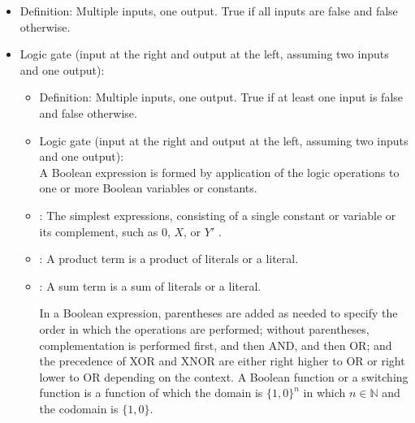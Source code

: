 \documentclass[a4paper,12pt]{article}
\begin{document}
\begin{itemize}
\begin{itemize}
\begin{itemize}
\begin{itemize}
\begin{itemize}
\begin{itemize}
\item Definition: Multiple inputs, one output. True if all inputs are false and false otherwise.
\item Logic gate (input at the right and output at the left, assuming two inputs and one output):\mbox{}\\
\eit
{}
\begin{itemize}
\item Definition: Multiple inputs, one output. True if at least one input is false and false otherwise.
\item Logic gate (input at the right and output at the left, assuming two inputs and one output):\mbox{}\\
\eit
{}
A Boolean expression is formed by application of the logic operations to one or more Boolean variables or constants. 

\bit
\item{}: The simplest expressions, consisting of a single constant or variable or its complement, such as $0$, $X$, or $Y′$ .
\item{}: A product term is a product of literals or a literal.
\item{}: A sum term is a sum of literals or a literal.
\eit

In a Boolean expression, parentheses are added as needed to specify the order in which the operations are performed; without parentheses, complementation is performed first, and then AND, and then OR; and the precedence of XOR and XNOR are either right higher to OR or right lower to OR depending on the context.
A Boolean function or a switching function is a function of which the domain is $\{1,0\}^n$ in which $n\in\mathbb{N}$ and the codomain is $\{1,0\}$.


\end{itemize}
\end{itemize}
\end{itemize}
\end{itemize}
\end{itemize}
\end{itemize}
\end{itemize}
\end{document}
